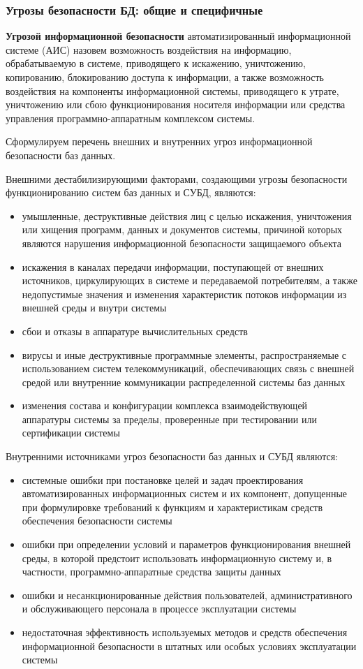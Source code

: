 \subsubsection{Угрозы безопасности БД: общие и специфичные}
\textbf{Угрозой информационной безопасности} автоматизированный информационной системе (АИС) назовем возможность воздействия на информацию, обрабатываемую в системе, приводящего к искажению, уничтожению, копированию, блокированию доступа к информации, а также возможность воздействия на компоненты информационной системы, приводящего к утрате, уничтожению или сбою функционирования носителя информации или средства управления программно-аппаратным комплексом системы.

Сформулируем перечень внешних и внутренних угроз информационной безопасности баз данных.

Внешними дестабилизирующими факторами, создающими угрозы безопасности функционированию систем баз данных и СУБД, являются:
\begin{itemize}
	\item умышленные, деструктивные действия лиц с целью искажения, уничтожения или хищения программ, данных и документов системы, причиной которых являются нарушения информационной безопасности защищаемого объекта
	\item искажения в каналах передачи информации, поступающей от внешних источников, циркулирующих в системе и передаваемой потребителям, а также недопустимые значения и изменения характеристик потоков информации из внешней среды и внутри системы
	\item сбои и отказы в аппаратуре вычислительных средств
	\item вирусы и иные деструктивные программные элементы, распространяемые с использованием систем телекоммуникаций, обеспечивающих связь с внешней средой или внутренние коммуникации распределенной системы баз данных
	\item изменения состава и конфигурации комплекса взаимодействующей аппаратуры системы за пределы, проверенные при тестировании или сертификации системы
\end{itemize}

Внутренними источниками угроз безопасности баз данных и СУБД являются:
\begin{itemize}
	\item системные ошибки при постановке целей и задач проектирования автоматизированных информационных систем и их компонент, допущенные при формулировке требований к функциям и характеристикам средств обеспечения безопасности системы
	\item ошибки при определении условий и параметров функционирования внешней среды, в которой предстоит использовать информационную систему и, в частности, программно-аппаратные средства защиты данных
	\item ошибки и несанкционированные действия пользователей, административного и обслуживающего персонала в процессе эксплуатации системы
	\item недостаточная эффективность используемых методов и средств обеспечения информационной безопасности в штатных или особых условиях эксплуатации системы
\end{itemize}

